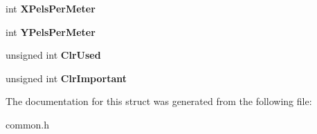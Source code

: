 \begin{DoxyCompactItemize}
\item 
\hypertarget{struct_b_i_t_m_a_p_i_n_f_o_h_e_a_d_e_r_aec0f57821f78a1eaed5bb3482e66dc7d}{}int {\bfseries X\+Pels\+Per\+Meter}\label{struct_b_i_t_m_a_p_i_n_f_o_h_e_a_d_e_r_aec0f57821f78a1eaed5bb3482e66dc7d}

\item 
\hypertarget{struct_b_i_t_m_a_p_i_n_f_o_h_e_a_d_e_r_a8635684020a33d3484b042310bca1b2a}{}int {\bfseries Y\+Pels\+Per\+Meter}\label{struct_b_i_t_m_a_p_i_n_f_o_h_e_a_d_e_r_a8635684020a33d3484b042310bca1b2a}

\item 
\hypertarget{struct_b_i_t_m_a_p_i_n_f_o_h_e_a_d_e_r_a4c70c25d035ccc693edaf429451a79f5}{}unsigned int {\bfseries Clr\+Used}\label{struct_b_i_t_m_a_p_i_n_f_o_h_e_a_d_e_r_a4c70c25d035ccc693edaf429451a79f5}

\item 
\hypertarget{struct_b_i_t_m_a_p_i_n_f_o_h_e_a_d_e_r_acff83c5a644237154c84ac280cd12cab}{}unsigned int {\bfseries Clr\+Important}\label{struct_b_i_t_m_a_p_i_n_f_o_h_e_a_d_e_r_acff83c5a644237154c84ac280cd12cab}

\end{DoxyCompactItemize}


The documentation for this struct was generated from the following file\+:\begin{DoxyCompactItemize}
\item 
common.\+h\end{DoxyCompactItemize}
